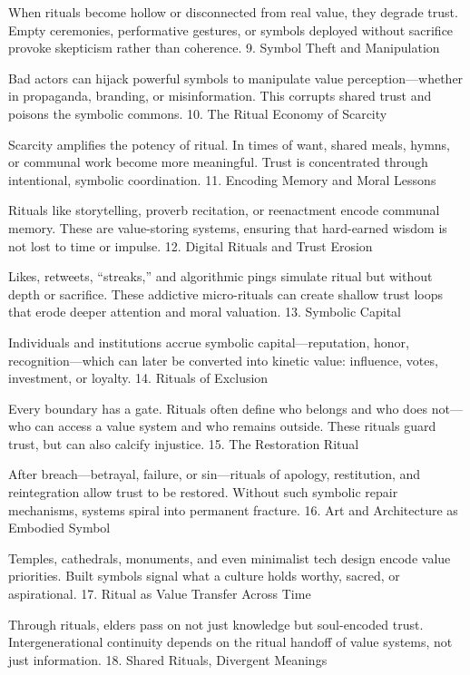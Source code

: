 \documentclass[11pt,oneside]{book}
\begin{document}
When rituals become hollow or disconnected from real value, they degrade trust. Empty ceremonies, performative gestures, or symbols deployed without sacrifice provoke skepticism rather than coherence.
9. Symbol Theft and Manipulation

Bad actors can hijack powerful symbols to manipulate value perception—whether in propaganda, branding, or misinformation. This corrupts shared trust and poisons the symbolic commons.
10. The Ritual Economy of Scarcity

Scarcity amplifies the potency of ritual. In times of want, shared meals, hymns, or communal work become more meaningful. Trust is concentrated through intentional, symbolic coordination.
11. Encoding Memory and Moral Lessons

Rituals like storytelling, proverb recitation, or reenactment encode communal memory. These are value-storing systems, ensuring that hard-earned wisdom is not lost to time or impulse.
12. Digital Rituals and Trust Erosion

Likes, retweets, “streaks,” and algorithmic pings simulate ritual but without depth or sacrifice. These addictive micro-rituals can create shallow trust loops that erode deeper attention and moral valuation.
13. Symbolic Capital

Individuals and institutions accrue symbolic capital—reputation, honor, recognition—which can later be converted into kinetic value: influence, votes, investment, or loyalty.
14. Rituals of Exclusion

Every boundary has a gate. Rituals often define who belongs and who does not—who can access a value system and who remains outside. These rituals guard trust, but can also calcify injustice.
15. The Restoration Ritual

After breach—betrayal, failure, or sin—rituals of apology, restitution, and reintegration allow trust to be restored. Without such symbolic repair mechanisms, systems spiral into permanent fracture.
16. Art and Architecture as Embodied Symbol

Temples, cathedrals, monuments, and even minimalist tech design encode value priorities. Built symbols signal what a culture holds worthy, sacred, or aspirational.
17. Ritual as Value Transfer Across Time

Through rituals, elders pass on not just knowledge but soul-encoded trust. Intergenerational continuity depends on the ritual handoff of value systems, not just information.
18. Shared Rituals, Divergent Meanings
\end{document}
